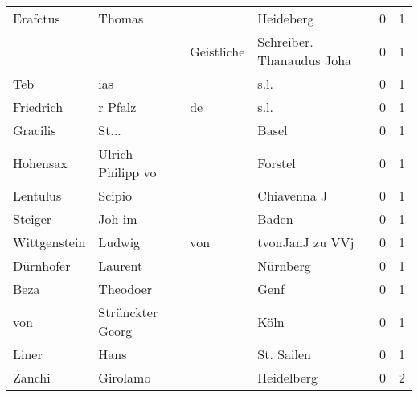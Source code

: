 \begin{center}
\begin{tiny}
\begin{longtabu}{llllrr}
                 Erafctus &                             Thomas &             &                                   Heideberg &          0 &         1 \\
                          &                                    &  Geistliche &                   Schreiber. Thanaudus Joha &          0 &         1 \\
                      Teb &                                ias &             &                                        s.l. &          0 &         1 \\
                Friedrich &                            r Pfalz &          de &                                        s.l. &          0 &         1 \\
                 Gracilis &                              St... &             &                                       Basel &          0 &         1 \\
                 Hohensax &                  Ulrich Philipp vo &             &                                     Forstel &          0 &         1 \\
                 Lentulus &                             Scipio &             &                                 Chiavenna J &          0 &         1 \\
                  Steiger &                             Joh im &             &                                       Baden &          0 &         1 \\
             Wittgenstein &                             Ludwig &         von &                             tvonJanJ zu VVj &          0 &         1 \\
                Dürnhofer &                            Laurent &             &                                    Nürnberg &          0 &         1 \\
                     Beza &                           Theodoer &             &                                        Genf &          0 &         1 \\
                      von &                   Strünckter Georg &             &                                        Köln &          0 &         1 \\
                    Liner &                               Hans &             &                                  St. Sailen &          0 &         1 \\
                   Zanchi &                           Girolamo &             &                                  Heidelberg &          0 &         2 \\

\end{longtabu}
\end{tiny}
\end{center}
